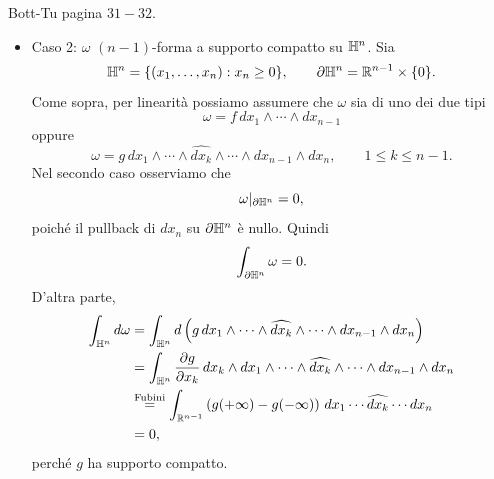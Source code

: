 \documentclass[a4paper]{article}
\begin{document}
\begin{snippetproof}{Bott-Tu pagina \(31-32\).}
\begin{itemize}
\[\begin{aligned}
        &=
        \int_{\realnumbers^{n-1}}
        \left[f(x_1,\ldots,x_{n-1},+\infty)-f(x_1,\ldots,x_{n-1},-\infty)\right]
        \,dx_1\cdots dx_{n-1} \\
        &=0,
        \end{aligned}
        \]
        dove i limiti per \(x_n\to\pm\infty\) sono da intendersi nel senso ovvio, e sono nulli perché \(f\) ha supporto compatto.
        D'altra parte
        \[
        \int_{\partial\realnumbers^n}\omega=0
        \]
        poiché \(\partial\realnumbers^n=\varnothing\). Quindi la formula di Stokes vale in questo caso.
        \item Caso 2: \(\omega\) \((n-1)\)-forma a supporto compatto su \(\mathbb{H}^n\).
        Sia
        \[
        \mathbb{H}^n=\{(x_1,\ldots,x_n):x_n\ge 0\},
        \qquad
        \partial\mathbb{H}^n=\mathbb{R}^{n-1}\times\{0\}.
        \]
        Come sopra, per linearità possiamo assumere che \(\omega\) sia di uno dei due tipi
        \[
        \omega=f\,dx_1\wedge\cdots\wedge dx_{n-1}
        \]
        oppure
        \[
        \omega=g\,dx_1\wedge\cdots\wedge\widehat{dx_k}\wedge\cdots\wedge dx_{n-1}\wedge dx_n,
        \qquad 1\le k\le n-1.
        \]
        Nel secondo caso osserviamo che
        \[
        \omega|_{\partial\mathbb{H}^n}=0,
        \]
        poiché il pullback di \(dx_n\) su \(\partial\mathbb{H}^n\) è nullo. Quindi
        \[
        \int_{\partial\mathbb{H}^n}\omega=0.
        \]
        D'altra parte,
        \[
        \begin{aligned}
        \int_{\mathbb{H}^n}d\omega
        &=\int_{\mathbb{H}^n}d\left(g\,dx_1\wedge\cdots\wedge\widehat{dx_k}\wedge\cdots\wedge dx_{n-1}\wedge dx_n\right) \\
        &=\int_{\mathbb{H}^n}\frac{\partial g}{\partial x_k}
        \,dx_k\wedge dx_1\wedge\cdots\wedge\widehat{dx_k}\wedge\cdots\wedge dx_{n-1}\wedge dx_n \\
        &\stackrel{\text{Fubini}}{=}
        \int_{\mathbb{R}^{n-1}}
        \left(g(+\infty)-g(-\infty)\right)
        \,dx_1\cdots\widehat{dx_k}\cdots dx_n \\
        &=0,
        \end{aligned}
        \]
        perché \(g\) ha supporto compatto.
        

\end{itemize}
\end{snippetproof}
\end{document}
